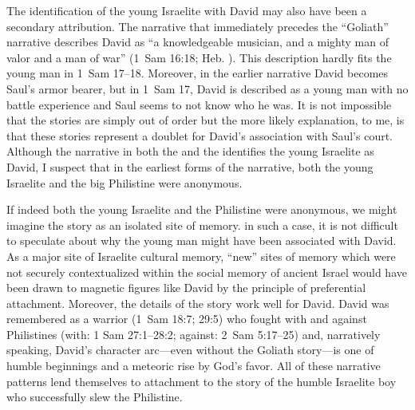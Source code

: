 The identification of the young Israelite with David may also have been a secondary attribution. The narrative that immediately precedes the ``Goliath'' narrative describes David as ``a knowledgeable musician, and a mighty man of valor and a man of war'' (1~Sam 16:18; Heb. ). This description hardly fits the young man in 1~Sam 17--18. Moreover, in the earlier narrative David becomes Saul's armor bearer, but in 1~Sam 17, David is described as a young man with no battle experience and Saul seems to not know who he was.%
    \autocite[70--71]{mckenzie2000}
It is not impossible that the stories are simply out of order but the more likely explanation, to me, is that these stories represent a doublet for David's association with Saul's court. Although the narrative in both the \mt and the \lxx identifies the young Israelite as David, I suspect that in the earliest forms of the narrative, both the young Israelite and the big Philistine were anonymous.

If indeed both the young Israelite and the Philistine were anonymous, we might imagine the story as an isolated site of memory. in such a case, it is not difficult to speculate about why the young man might have been associated with David. As a major site of Israelite cultural memory, ``new'' sites of memory which were not securely contextualized within the social memory of ancient Israel would have been drawn to magnetic figures like David by the principle of preferential attachment. Moreover, the details of the story work well for David. David was remembered as a warrior (1~Sam 18:7; 29:5) who fought with and against Philistines (with: 1 Sam 27:1--28:2; against: 2~Sam 5:17--25) and, narratively speaking, David's character arc---even without the Goliath story---is one of humble beginnings and a meteoric rise by God's favor. All of these narrative patterns lend themselves to attachment to the story of the humble Israelite boy who successfully slew the Philistine.
    
